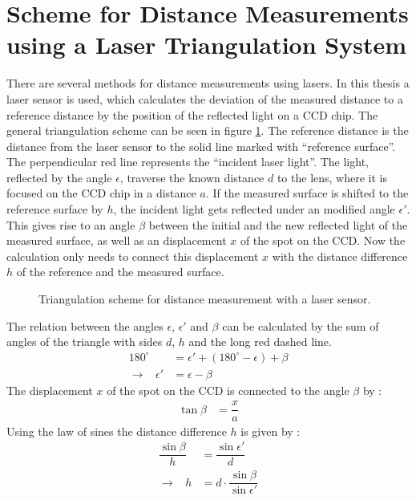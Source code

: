 \documentclass[
a4paper,                                %
twoside,                                %
BCOR1.4cm,                      %
10pt,                           %
headings=normal,                %
headsepline,                    %
clearplainpage, %
final,                                  %
div=14,
parskip=full,
openright,
bibliography=toc
]{scrreprt}
\begin{document}
\section{Scheme for Distance Measurements using a Laser Triangulation System} %

There are several methods for distance measurements using lasers. In this thesis a laser sensor is used, which calculates the deviation of the measured distance to a reference distance by the position of the reflected light on a CCD chip. The general triangulation scheme can be seen in figure \ref{laserTriang}. The reference distance is the distance from the laser sensor to the solid line marked with ``reference surface''. The perpendicular red line represents the ``incident laser light''. 
The light, reflected by the angle $\epsilon$, traverse the known distance $d$ to the lens, where it is focused on the CCD chip in a distance $a$. If the measured surface is shifted to the reference surface by $h$, the incident light gets reflected under an modified angle $\epsilon'$. This gives rise to an angle $\beta$ between the initial and the new reflected light of the measured surface, as well as an displacement $x$ of the spot on the CCD. Now the calculation only needs to connect this displacement $x$ with the distance difference $h$ of the reference and the measured surface.
\begin{figure}[H]
	\centering
	\caption{Triangulation scheme for distance measurement with a laser sensor.}
	\label{laserTriang}
\end{figure}

The relation between the angles $\epsilon$, $\epsilon'$ and $\beta$ can be calculated by the sum of angles of the triangle with sides $d$, $h$ and the long red dashed line.
\begin{align}
	180^{\circ} &= \epsilon' + \left( 180^{\circ} - \epsilon \right) + \beta 
	\nonumber
	\\
	\rightarrow \;\;\; \epsilon' &= \epsilon - \beta
	\label{epsilonprime}
\end{align}
The displacement $x$ of the spot on the CCD is connected to the angle $\beta$ by : 
\begin{align}
	\tan \beta &= \dfrac{x}{a} 
	\label{tanbeta}
\end{align} 
Using the law of sines the distance difference $h$ is given by :
\begin{align}
	\dfrac{\sin \beta}{h} &= \dfrac{\sin \epsilon'}{d} 
	\nonumber
	\\
	\rightarrow \;\;\; h &= d \cdot \dfrac{\sin \beta}{\sin \epsilon'}
	\label{disdiffirst}
\end{align}
\end{document}
